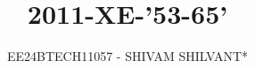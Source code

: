 \documentclass[journal]{IEEEtran}
\begin{document}

\vspace{3cm}

\title{2011-XE-'53-65'}
\author{EE24BTECH11057 - SHIVAM SHILVANT*
}
{\let\newpage\relax\maketitle}

\renewcommand{\thefigure}{\theenumi}
\renewcommand{\thetable}{\theenumi}
\setlength{\intextsep}{10pt} %


\renewcommand{\thetable}{\theenumi}
\end{document}
